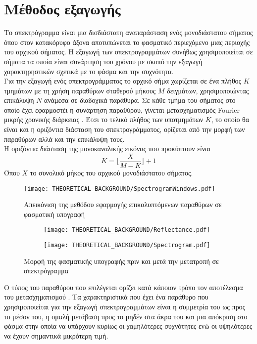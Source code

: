 \section{Μέθοδος εξαγωγής }
Το σπεκτρόγραμμα είναι μια δισδιάστατη αναπαράσταση ενός μονοδιάστατου σήματος όπου στον κατακόρυφο άξονα αποτυπώνεται το φασματικό περιεχόμενο μιας περιοχής του αρχικού σήματος. Η εξαγωγή των σπεκτρογραμμάτων συνήθως χρησιμοποιείται σε σήματα τα οποία είναι συνάρτηση του χρόνου με σκοπό την εξαγωγή χαρακτηρηστικών σχετικά με το φάσμα και την συχνότητα.\\
Για την εξαγωγή ενός σπεκτρογράμματος το αρχικό σήμα χωρίζεται σε ένα πλήθος $K$ τμημάτων με τη χρήση παραθύρων σταθερού μήκους $M$ δειγμάτων, χρησιμοποιώντας επικάλυψη $N$ ανάμεσα σε διαδοχικά παράθυρα. Σε κάθε τμήμα του σήματος στο οποίο έχει εφαρμοστέι η συνάρτηση παραθύρου, γίνεται μετασχηματισμός Fourier μικρής χρονικής διάρκειας . Έτσι το τελικό πλήθος των υποτμημάτων $K$, το οποίο θα είναι και η οριζόντια διάσταση του σπεκτρογράμματος, ορίζεται από την μορφή των παραθύρων αλλά και την επικάλυψη τους.\\
Η οριζόντια διάσταση της μονοκαναλικής εικόνας που προκύπτουν είναι 
$$K=\lfloor\frac{X}{M-K}\rfloor+1$$
Όπου $X$ το συνολικό μήκος του αρχικού μονοδιάστατου σήματος.

\begin{figure}[H]
  \begin{center}
    \texttt{[image: THEORETICAL\_BACKGROUND/SpectrogramWindows.pdf]}
    \caption{Απεικόνιση της μεθόδου εφαρμογής επικαλυπτόμενων παραθύρων σε φασματική υπογραφή}
  \end{center}
\end{figure}

\begin{figure}[H]
    \begin{subfigure}{0.5\textwidth}
        \texttt{[image: THEORETICAL\_BACKGROUND/Reflectance.pdf]}
    \end{subfigure}
    \begin{subfigure}{0.5\textwidth}
        \texttt{[image: THEORETICAL\_BACKGROUND/Spectrogram.pdf]}
    \end{subfigure}
    \caption{Μορφή της φασματικής υπογραφής πριν και μετά την μετατροπή σε σπεκτρόγραμμα}
\end{figure}

Ο τύπος του παραθύρου που επιλέγεται ορίζει κατά κάποιον τρόπο τον αποτέλεσμα του μετασχηματισμού . Τα χαρακτηριστικά που έχει ένα παράθυρο που χρησιμοποιείται για την εξαγωγή σπεκτρογραμμάτων είναι η συμμετρία του ως προς το μέσον του, η ομαλή μετάβαση προς το μηδέν στα άκρα του και μια απόκριση στο φάσμα στην οποία να υπάρχουν κυρίως οι χαμηλότερες συχνότητες ενώ οι υψηλότερες να έχουν σημαντικά μικρότερη τιμή.

